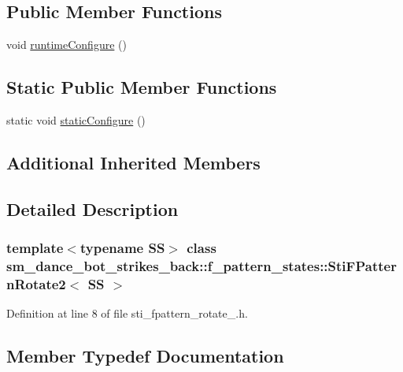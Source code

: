 \subsection*{Public Member Functions}
\begin{DoxyCompactItemize}
\item 
void \hyperlink{structsm__dance__bot__strikes__back_1_1f__pattern__states_1_1StiFPatternRotate2_a54623ed8b5626934d8f4a8dc8c2cf0b9}{runtime\+Configure} ()
\end{DoxyCompactItemize}
\subsection*{Static Public Member Functions}
\begin{DoxyCompactItemize}
\item 
static void \hyperlink{structsm__dance__bot__strikes__back_1_1f__pattern__states_1_1StiFPatternRotate2_ad184e0900067be776d9ddc9f76b470f5}{static\+Configure} ()
\end{DoxyCompactItemize}
\subsection*{Additional Inherited Members}


\subsection{Detailed Description}
\subsubsection*{template$<$typename SS$>$\newline
class sm\+\_\+dance\+\_\+bot\+\_\+strikes\+\_\+back\+::f\+\_\+pattern\+\_\+states\+::\+Sti\+F\+Pattern\+Rotate2$<$ S\+S $>$}



Definition at line 8 of file sti\+\_\+fpattern\+\_\+rotate\+\_.\+h.



\subsection{Member Typedef Documentation}
\mbox{\label{structsm__dance__bot__strikes__back_1_1f__pattern__states_1_1StiFPatternRotate2_a38d675680103f33804a077e9f8fbec83}} 
